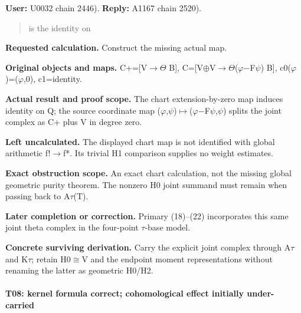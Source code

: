 \textbf{User:} U0032
\protect{} chain 2446).
\textbf{Reply:} A1167
\protect{} chain 2520).

\begin{quote}
is the identity on
\end{quote}

\textbf{Requested calculation.} Construct the missing actual map.

\textbf{Original objects and maps.}
C+=[V\allowbreak{}\ensuremath{→}\allowbreak{}\allowbreak{}\ensuremath{Θ}\allowbreak{}
B{]},
C=[V\allowbreak{}\ensuremath{⊕}\allowbreak{}V\allowbreak{}\ensuremath{→}\allowbreak{}\allowbreak{}\ensuremath{Θ}\allowbreak{}(\allowbreak{}\ensuremath{φ}\allowbreak{}\allowbreak{}\ensuremath{−}\allowbreak{}F\allowbreak{}\ensuremath{ψ}\allowbreak{})
B{]},
c0(\allowbreak{}\ensuremath{φ}\allowbreak{})=(\allowbreak{}\ensuremath{φ}\allowbreak{},0),
c1=identity.

\textbf{Actual result and proof scope.} The chart extension-by-zero map
induces identity on Q; the source coordinate map
(\allowbreak{}\ensuremath{φ}\allowbreak{},\allowbreak{}\ensuremath{ψ}\allowbreak{})\allowbreak{}\ensuremath{↦}\allowbreak{}(\allowbreak{}\ensuremath{φ}\allowbreak{}\allowbreak{}\ensuremath{−}\allowbreak{}F\allowbreak{}\ensuremath{ψ}\allowbreak{},\allowbreak{}\ensuremath{ψ}\allowbreak{})
splits the joint complex as C+ plus V in degree zero.

\textbf{Left uncalculated.} The displayed chart map is not identified
with global arithmetic f!\allowbreak{}\ensuremath{→}\allowbreak{}f*. Its
trivial H1 comparison supplies no weight estimates.

\textbf{Exact obstruction scope.} An exact chart calculation, not the
missing global geometric purity theorem. The nonzero H0 joint summand
must remain when passing back to
A\allowbreak{}\ensuremath{τ}\allowbreak{}(T).

\textbf{Later completion or correction.} Primary (18)--(22) incorporates
this same joint theta complex in the four-point
\allowbreak{}\ensuremath{τ}\allowbreak{}-base model.

\textbf{Concrete surviving derivation.} Carry the explicit joint complex
through A\allowbreak{}\ensuremath{τ}\allowbreak{} and
K\allowbreak{}\ensuremath{τ}\allowbreak{}; retain
H0\allowbreak{}\ensuremath{≅}\allowbreak{}V and the endpoint moment
representations without renaming the latter as geometric H0/H2.

\paragraph{T08: kernel formula correct; cohomological effect initially
under-carried}\label{t08-kernel-formula-correct-cohomological-effect-initially-under-carried}

